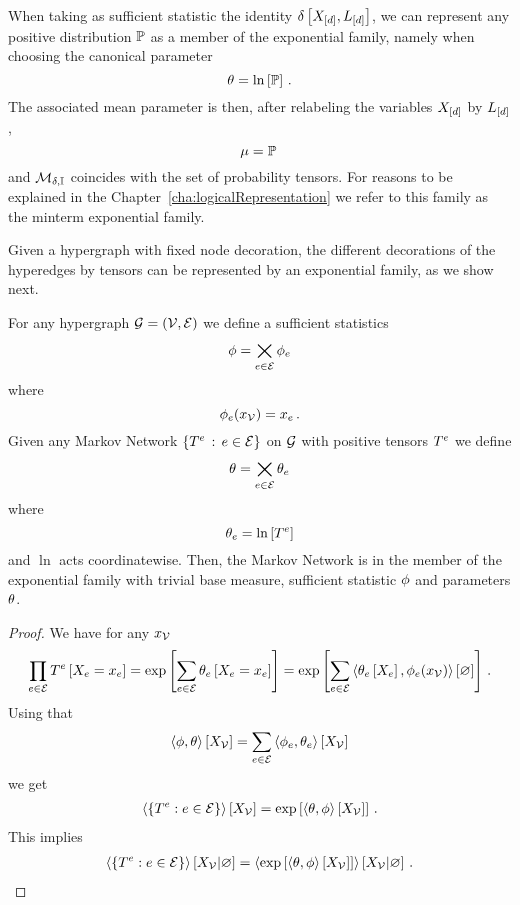 \begin{example}\label{exa:mintermExpFamily}
	When taking as sufficient statistic the identity $\delta\left[X_{[d]},L_{[d]}\right]$, we can represent any positive distribution $\mathbb{P}$ as a member of the exponential family, namely when choosing the canonical parameter
		\[ \theta = \ln \left[ \mathbb{P} \right] \, . \]
	The associated mean parameter is then, after relabeling the variables $X_{[d]}$ by $L_{[d]}$,
		\[ \mu = \mathbb{P} \,  \]
	and $\mathcal{M}_{\delta,\mathbb{I}}$ coincides with the set of probability tensors.
	For reasons to be explained in the Chapter~\ref{cha:logicalRepresentation} we refer to this family as the minterm exponential family.
\end{example}


Given a hypergraph with fixed node decoration, the different decorations of the hyperedges by tensors can be represented by an exponential family, as we show next.

\begin{theorem}
	For any hypergraph $\mathcal{G}=(\mathcal{V},\mathcal{E})$ we define a sufficient statistics 
		\[ \phi = \bigtimes_{e\in\mathcal{E}}  \phi_{e} \]
	where 
		\[ \phi_{e}(x_{\mathcal{V}}) = x_{e} \, . \]
	Given any Markov Network $\{T^{e} \, : \, e\in\mathcal{E}\}$ on $\mathcal{G}$ with positive tensors $T^{e}$ we define
		\[ \theta = \bigtimes_{e\in\mathcal{E}} \theta_{e} \]
	where
		\[ \theta_{e} =  \ln \left[ T^{e} \right] \]
	and $\ln$ acts coordinatewise.
	Then, the Markov Network is in the member of the exponential family with trivial base measure, sufficient statistic $\phi$ and parameters $\theta$.
\end{theorem}
\begin{proof}
	We have for any $x_{\mathcal{V}}$
	\begin{align}
	\prod_{e\in\mathcal{E}} T^{e}\left[X_{e}=x_{e}\right]
		= \mathrm{exp}\left[\sum_{e\in\mathcal{E}} \theta_{e}\left[X_{e}=x_{e}\right]\right]
		= \mathrm{exp}\left[\sum_{e\in\mathcal{E}} \left\langle \theta_{e}\left[X_{e}\right],\phi_{e}(x_{\mathcal{V}})\right\rangle \left[ \varnothing \right]\right]  \, .
	\end{align}
	Using that
		\[ \left\langle \phi,\theta\right\rangle \left[ X_{\mathcal{V}} \right] = \sum_{e\in\mathcal{E}} \left\langle \phi_{e},\theta_{e}\right\rangle \left[ X_{\mathcal{V}} \right] \]
	we get
	\begin{align}
		\left\langle \{T^{e}: e\in\mathcal{E}\}\right\rangle \left[ X_{\mathcal{V}} \right] = \mathrm{exp}\left[\left\langle \theta,\phi\right\rangle \left[ X_{\mathcal{V}} \right]\right] \, .
	\end{align}
	This implies 
	\begin{align}
		\left\langle \{T^{e}: e\in\mathcal{E}\}\right\rangle \left[ X_{\mathcal{V}} | \varnothing \right] = \left\langle \mathrm{exp}\left[\left\langle \theta,\phi\right\rangle \left[ X_{\mathcal{V}} \right]\right]\right\rangle \left[ X_{\mathcal{V}} | \varnothing \right] \, .
	\end{align}
\end{proof}



